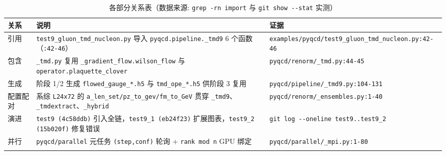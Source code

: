 \documentclass[UTF8]{ctexart}
\begin{document}
\tiny
\begin{xltabular}{\textwidth}{lXl}
\toprule
\textcolor{relation}{关系} & 说明 & 证据 \\
\midrule
\endhead
引用 & \texttt{\nolinkurl{test9\_gluon\_tmd\_nucleon.py}} 导入 \texttt{\nolinkurl{pyqcd.pipeline.\_tmd9}} 6 个函数（\texttt{\nolinkurl{:42-46}}） & \texttt{\nolinkurl{examples/pyqcd/test9\_gluon\_tmd\_nucleon.py:42-46}} \\
包含 & \texttt{\nolinkurl{\_tmd.py}} 复用 \texttt{\nolinkurl{\_gradient\_flow.wilson\_flow}} 与 \texttt{\nolinkurl{operator.plaquette\_clover}} & \texttt{\nolinkurl{pyqcd/renorm/\_tmd.py:44-45}} \\
生成 & 阶段 1/2 生成 \texttt{\nolinkurl{flowed\_gauge\_*.h5}} 与 \texttt{\nolinkurl{tmd\_ope\_*.h5}} 供阶段 3 复用 & \texttt{\nolinkurl{pyqcd/pipeline/\_tmd9.py:104-131}} \\
配置配对 & 系综 \texttt{\nolinkurl{L24x72}} 的 \texttt{\nolinkurl{a\_len\_set/pz\_to\_gev/fm\_to\_GeV}} 贯穿 \texttt{\nolinkurl{\_tmd9}}、\texttt{\nolinkurl{\_tmdextract}}、\texttt{\nolinkurl{\_hybrid}} & \texttt{\nolinkurl{pyqcd/renorm/\_ensembles.py:1-40}} \\
演进 & \texttt{\nolinkurl{test9 (4c58ddb)}} 引入全链，\texttt{\nolinkurl{test9\_1 (eb24f23)}} 扩展图表，\texttt{\nolinkurl{test9\_2 (15b020f)}} 修复错误 & \texttt{\nolinkurl{git log --oneline test9..test9\_2}} \\
并行 & \texttt{\nolinkurl{pyqcd/parallel}} 元任务 \texttt{\nolinkurl{(step,conf)}} 轮询 + \texttt{\nolinkurl{rank mod n}} GPU 绑定 & \texttt{\nolinkurl{pyqcd/parallel/\_mpi.py:1-80}} \\
\bottomrule
\caption{各部分关系表（数据来源: \texttt{\nolinkurl{grep -rn import}} 与 \texttt{\nolinkurl{git show --stat}} 实测）}
\end{xltabular}
\end{document}

